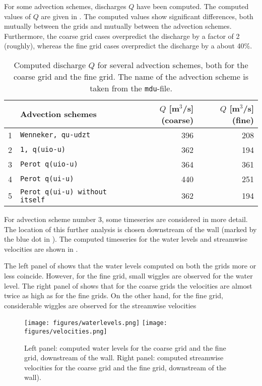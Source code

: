 For some advection schemes, discharges $Q$ have been computed. The computed values of $Q$ are given in . The computed values show significant differences, both mutually between the grids and mutually between the advection schemes. Furthermore, the coarse grid cases overpredict the discharge by a factor of 2 (roughly), whereas the fine grid cases overpredict the discharge by a about 40\%.

\begin{table}[h!]
\centering
\caption{Computed discharge $Q$ for several advection schemes, both for the coarse grid and the fine grid. The name of the advection scheme is taken from the \texttt{mdu}-file.}
\label{tab:advecdischarges}
\begin{tabular}{r p{6cm} r r} \hline
   & Advection schemes           & $Q$ [m$^3$/s] (coarse)  &  $Q$ [m$^3$/s] (fine) \\ \hline \hline
1 & \texttt{Wenneker, qu-udzt}                   & 396  &  208   \\
2 & \texttt{1, q(uio-u)}                         & 362  &  194   \\
3 & \texttt{Perot q(uio-u)}                      & 364  &  361   \\
4 & \texttt{Perot q(ui-u)}                       & 440  &  251   \\ 
5 & \texttt{Perot q(ui-u) without itself}        & 362  &  194   \\ \hline
\end{tabular}
\end{table}

For advection scheme number 3, some timeseries are considered in more detail. The location of this further analysis is chosen downstream of the wall (marked by the blue dot in ). The computed timeseries for the water levels and streamwise velocities are shown in .

The left panel of  shows that the water levels computed on both the grids more or less coincide. However, for the fine grid, small wiggles are observed for the water level. The right panel of  shows that for the coarse grids the velocities are almost twice as high as for the fine grids. On the other hand, for the fine grid, considerable wiggles are observed for the streamwise velocities

\begin{figure}[h!]
\begin{center}
\texttt{[image: figures/waterlevels.png]}
\texttt{[image: figures/velocities.png]}
\end{center}\caption{Left panel: computed water levels for the coarse grid and the fine grid, downstream of the wall. Right panel: computed streamwise velocities for the coarse grid and the fine grid, downstream of the wall). \label{fig:wallseries}}
\end{figure}






